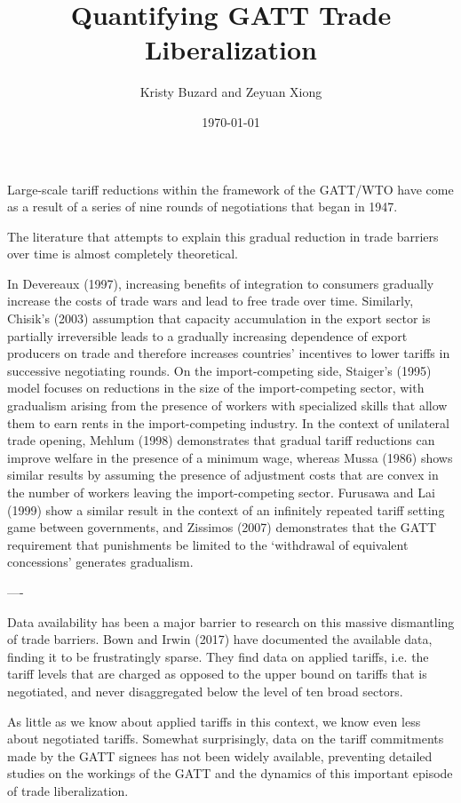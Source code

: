 \documentclass[12pt]{article}
\begin{document}
\title{\vskip-0.6in Quantifying GATT Trade Liberalization}
\author{Kristy Buzard and Zeyuan Xiong}
\date{\today}
\maketitle

Large-scale tariff reductions within the framework of the GATT/WTO have come as a result of a series of nine rounds of negotiations that began in 1947. 

The literature that attempts to explain this gradual reduction in trade barriers over time is almost completely theoretical. 

In Devereaux (1997), increasing benefits of integration to consumers gradually increase the costs of trade wars and lead to free trade over time. Similarly, Chisik's (2003) assumption that capacity accumulation in the export sector is partially irreversible leads to a gradually increasing dependence of export producers on trade and therefore increases countries' incentives to lower tariffs in successive negotiating rounds. On the import-competing side, Staiger's (1995) model focuses on reductions in the size of the import-competing sector, with gradualism arising from the presence of workers with specialized skills that allow them to earn rents in the import-competing industry. In the context of unilateral trade opening, Mehlum (1998) demonstrates that gradual tariff reductions can improve welfare in the presence of a minimum wage, whereas Mussa (1986) shows similar results by assuming the presence of adjustment costs that are convex in the number of workers leaving the import-competing sector. Furusawa and Lai (1999) show a similar result in the context of an infinitely repeated tariff setting game between governments, and Zissimos (2007) demonstrates that the GATT requirement that punishments be limited to the `withdrawal of equivalent concessions' generates gradualism.

----

Data availability has been a major barrier to research on this massive dismantling of trade barriers. Bown and Irwin (2017) have documented the available data, finding it to be frustratingly sparse. They find data on applied tariffs, i.e. the tariff levels that are charged as opposed to the upper bound on tariffs that is negotiated, and never disaggregated below the level of ten broad sectors. 

As little as we know about applied tariffs in this context, we know even less about negotiated tariffs. Somewhat surprisingly, data on the tariff commitments made by the GATT signees has not been widely available, preventing detailed studies on the workings of the GATT and the dynamics of this important episode of trade liberalization.
\end{document}
